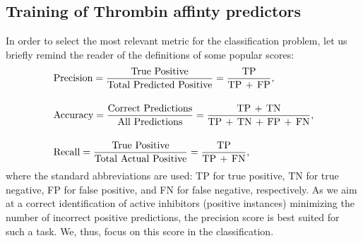 \documentclass[12pt]{article}
\begin{document}
\subsection*{\sffamily \large Training of Thrombin affinty predictors}

In order to select the most relevant metric for the classification problem, let us briefly remind the reader of the definitions of some popular scores:
%
\begin{align*}
&{\rm 
Precision = \frac{True\ Positive}{Total\ Predicted\ Positive}
 = \frac{TP}{TP \, + \, FP}
},\\[12pt] 
&{\rm 
Accuracy = \frac{Correct\ Predictions}{All\ Predictions}
 = \frac{TP \, + \, TN}{TP \, + \, TN \, +\, FP \, +\, FN}
},\\[12pt]
&{\rm 
Recall = \frac{True\ Positive}{Total\ Actual\ Positive}
 = \frac{TP}{TP \, + \, FN}
},
\end{align*}
where the standard abbreviations are used: TP for true positive, TN for true negative, FP for false positive, and FN for false negative, respectively.
As we aim at a correct identification of active inhibitors (positive instances) minimizing the number of incorrect positive predictions, the precision score is best suited for such a task.
We, thus, focus on this score in the classification.
\end{document}
